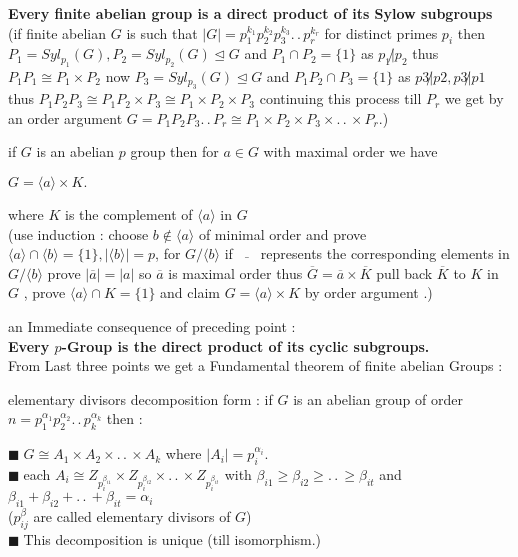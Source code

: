 \documentclass[11pt]{extarticle}
\newcommand{\ck}{.\,.\,}
\newcommand{\snote}[1]{{\footnotesize(#1)}}
\newcommand{\y}{$\blacksquare\;$}
\newcommand{\gen}[1]{\langle #1 \rangle}
\newcommand{\tbx}[2][]{
	\begin{tcolorbox}[enhanced,breakable,size=small,colback=black!2!white,title={#1},arc is angular, arc=1.5mm,drop fuzzy shadow]
		#2
	\end{tcolorbox}
}
\begin{document}
\begin{multicols}{2}
{		
	}
	\tbx{{\large \textbf{Every finite abelian group is a direct product of its Sylow subgroups} }\\
		\snote{if finite abelian $ G $ is such that $ |G|= p_1^{k_1}p_2^{k_2}p_3^{k_3}\ck p_r^{k_r} $ for distinct primes $ p_i $ then $ P_1=Syl_{p_1}(G), P_2=Syl_{p_2}(G) \trianglelefteq G$ and $ P_1 \cap P_2 =\{1\} $ as $ p_1 \not| p_2 $ thus $ P_1P_1\cong P_1 \times P_2 $ now $ P_3=Syl_{p_3}(G) \trianglelefteq G$ and $ P_1P_2 \cap P_3 =\{1\}$ as $ p3\not| p2,p3 \not|p1 $ thus $ P_1P_2P_3\cong P_1 P_2 \times P_3 \cong P_1\times P_2 \times P_3 $ continuing this process till $ P_r $ we get by an order argument $ G=P_1P_2P_3\ck P_r \cong P_1 \times P_2 \times P_3 \times \ck \times P_r .$}
	}
	\tbx{if  $G $ is an abelian $ p $ group then for $ a\in G $ with maximal order we have 
		\begin{center}
			$ G= \gen{a}\times K .$
		\end{center}where $ K $ is the complement of $ \gen{a} $ in $ G $ \\
		\snote{use induction : choose $ b\notin \gen{a} $ of minimal order and prove $ \gen{a}\cap \gen{b}=\{1\},|\gen{b}|=p $, for $ G/\gen{b} $ if  $\,\bar{\quad} \,$ represents the corresponding elements in $ G/\gen{b} $ prove $ |\overline{a}| =|a|$  so $ \overline{a} $ is maximal order thus $ \overline{G}=\overline{a}\times \overline{K} $ pull back $ \overline{K} $ to $ K $ in $ G $ , prove $ \gen{a}\cap K =\{1\} $ and claim $ G=\gen{a}\times K $ by order argument .}
	}
	\tbx{an Immediate consequence of preceding point :\\
		\textbf{ Every $ p $-Group is the direct product of its cyclic subgroups.}\\
		From Last three points we get a Fundamental theorem of finite abelian Groups :
	}
	\tbx[\textbf{ Fundamental theorem of finite abelian Groups} ]{elementary divisors decomposition form :  
		if $ G $ is an abelian group of order $ n=p_1^{\alpha_1}p_2^{\alpha_2}\ck p_k^{\alpha_k} $ then :
		
		\y  $ G \cong A_1 \times A_2 \times \ck \times A_k $ where $ |A_i|=p_i^{\alpha_i} .$ \\
		\y  each $ A_i \cong Z_{p_i^{\beta_{i1}}} \times Z_{p_i^{\beta_{i2}}}\times \ck \times Z_{p_i^{\beta_{it}}}$  with  
		$ \beta_{i1}\geq \beta_{i2} \geq \ck \geq \beta_{it} $ and $ \beta_{i1}+\beta_{i2}+\ck +\beta_{it} = \alpha_i $\\
		\snote{$ p^\beta_{ij} $ are called elementary divisors of $ G $}\\
		\y  This decomposition is unique (till isomorphism.) 
		
}
\end{multicols}
\end{document}
